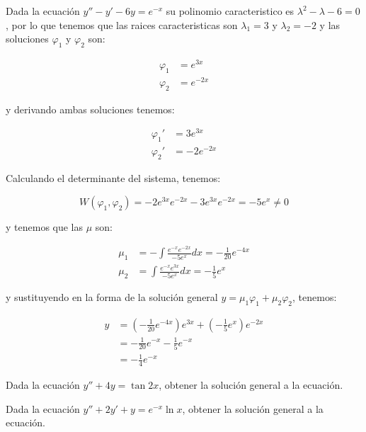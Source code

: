 		\begin{ejemplo}
			Dada la ecuación $y'' - y' - 6 y = e^{-x}$ su polinomio caracteristico  es $\lambda^2 - \lambda - 6 = 0$, por lo que tenemos que las raices caracteristicas son $\lambda_1 = 3$ y $\lambda_2 = -2$ y las soluciones $\varphi_1$ y $\varphi_2$ son:

			\begin{align*}
				\varphi_1 &= e^{3x} \\
				\varphi_2 &= e^{-2x}
			\end{align*}

			y derivando ambas soluciones tenemos:

			\begin{align*}
				\varphi_1' &= 3e^{3x} \\
				\varphi_2' &= -2e^{-2x}
			\end{align*}

			Calculando el determinante del sistema, tenemos:

			\begin{equation*}
				W(\varphi_1, \varphi_2) = -2 e^{3x} e^{-2x} - 3 e^{3x} e^{-2x} = -5 e^{x} \ne 0
			\end{equation*}

			y tenemos que las $\mu$ son:

			\begin{align*}
				\mu_1 &= - \int \frac{e^{-x} e^{-2x}}{-5 e^{x}} dx = - \frac{1}{20} e^{-4x} \\
				\mu_2 &= \int \frac{e^{-x} e^{3x}}{-5 e^{x}} dx = - \frac{1}{5} e^x
			\end{align*}

			y sustituyendo en la forma de la solución general $y = \mu_1 \varphi_1 + \mu_2 \varphi_2$, tenemos:

			\begin{align*}
				y &= (- \frac{1}{20} e^{-4x}) e^{3x} + (- \frac{1}{5} e^x) e^{-2x} \\
				&= -\frac{1}{20} e^{-x} - \frac{1}{5} e^{-x} \\
				&= -\frac{1}{4} e^{-x}
			\end{align*}
		\end{ejemplo}

		\begin{ejercicio}
			Dada la ecuación $y'' + 4 y = \tan{2x}$, obtener la solución general a la ecuación.
		\end{ejercicio}

		\begin{ejercicio}
			Dada la ecuación $y'' + 2 y' + y = e^{-x} \ln{x}$, obtener la solución general a la ecuación.
		\end{ejercicio}

